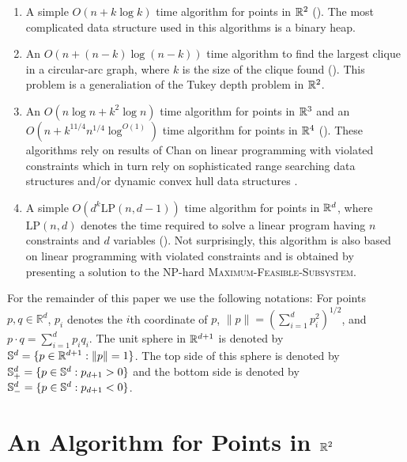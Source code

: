 \documentclass[charterfonts,lotsofwhite]{patmorin}
\newcommand{\lp}{\mathrm{LP}}
\begin{document}
\begin{enumerate}
\item A simple $O(n + k\log k)$ time algorithm for points in $\mathbb{R}^2$
().  The most complicated data structure used in this
algorithms is a binary heap.

\item An $O(n + (n-k)\log(n-k))$ time algorithm to find the largest
clique in a circular-arc graph, where $k$ is the size of the clique
found ().  This problem is a generaliation of the
Tukey depth problem in $\mathbb{R}^2$.

\item An $O(n\log n + k^2\log n)$ time algorithm for points in $\mathbb{R}^3$
and an $O(n + k^{11/4}n^{1/4}\log^{O(1)})$ time algorithm for points
in $\mathbb{R}^4$ ().  These algorithms rely on results of Chan
on linear programming with violated constraints \cite{X} which in turn
rely on sophisticated range searching data structures \cite{X} and/or
dynamic convex hull data structures \cite{X}.

\item A simple $O(d^k \lp(n,d-1))$ time algorithm for points in
$\mathbb{R}^d$, where $\lp(n,d)$ denotes the time required to solve a linear
program having $n$ constraints and $d$ variables ().
Not surprisingly, this algorithm is also based on linear programming
with violated constraints and is obtained by presenting a solution to
the NP-hard \textsc{Maximum-Feasible-Subsystem}.
\end{enumerate}

For the remainder of this paper we use the following notations: For
points $p,q\in\mathbb{R}^d$, $p_i$ denotes the $i$th coordinate of
$p$, $\|p\|=(\sum_{i=1}^d p_i^2)^{1/2}$, and $p\cdot
q=\sum_{i=1}^d p_iq_i$.  The unit sphere in $\mathbb{R}^{d+1}$ is denoted by
$\mathbb{S}^d =\{ p\in\mathbb{R}^{d+1} : \|p\|=1\}$. The top side of this sphere is
denoted by $\mathbb{S}^d_+ =\{ p\in\mathbb{S}^{d} : p_{d+1} > 0 \}$ and the bottom
side is denoted by $\mathbb{S}^d_- =\{ p\in\mathbb{S}^{d} : p_{d+1} < 0 \}$.



\section{An Algorithm for Points in $\mathbb{R}^2$}
\end{document}

